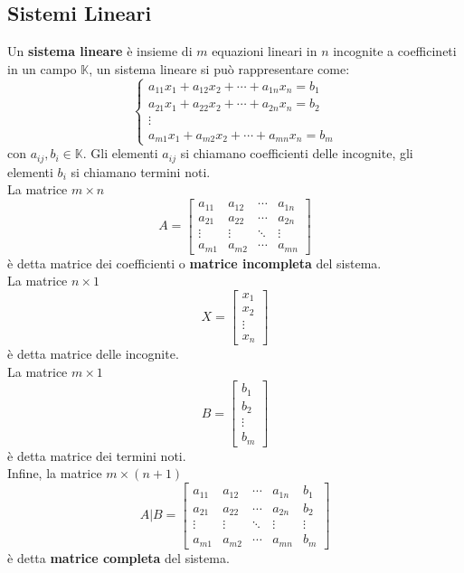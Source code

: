 \documentclass{article}
\begin{document}
\subsection{Sistemi Lineari}
Un \textbf{sistema lineare} è insieme di $m$ equazioni lineari in $n$ incognite
a coefficineti in un campo $\mathbb{K}$, un sistema lineare si può
rappresentare come:
\[
    \begin{cases}
        a_{11}x_1 + a_{12}x_2 + \cdots + a_{1n}x_n = b_1 \\
        a_{21}x_1 + a_{22}x_2 + \cdots + a_{2n}x_n = b_2 \\
        \vdots                                           \\
        a_{m1}x_1 + a_{m2}x_2 + \cdots + a_{mn}x_n = b_m
    \end{cases}
\]
con $a_{ij}, b_i \in \mathbb{K}$. Gli elementi $a_{ij}$ si chiamano
coefficienti delle incognite, gli elementi $b_i$ si chiamano termini noti.\\ La
matrice $m\times n$
\[
    A = \begin{bmatrix}
        a_{11} & a_{12} & \cdots & a_{1n} \\
        a_{21} & a_{22} & \cdots & a_{2n} \\
        \vdots & \vdots & \ddots & \vdots \\
        a_{m1} & a_{m2} & \cdots & a_{mn}
    \end{bmatrix}
\]
è detta matrice dei coefficienti o \textbf{matrice incompleta} del sistema.\\
La matrice $n\times 1$
\[
    X = \begin{bmatrix}
        x_1    \\
        x_2    \\
        \vdots \\
        x_n
    \end{bmatrix}
\]
è detta matrice delle incognite.\\
La matrice $m\times 1$
\[
    B = \begin{bmatrix}
        b_1    \\
        b_2    \\
        \vdots \\
        b_m
    \end{bmatrix}
\]
è detta matrice dei termini noti.\\
Infine, la matrice $m\times (n+1)$
\[
    A|B = \begin{bmatrix}
        a_{11} & a_{12} & \cdots & a_{1n} & b_1    \\
        a_{21} & a_{22} & \cdots & a_{2n} & b_2    \\
        \vdots & \vdots & \ddots & \vdots & \vdots \\
        a_{m1} & a_{m2} & \cdots & a_{mn} & b_m
    \end{bmatrix}
\]
è detta \textbf{matrice completa} del sistema.
\end{document}
